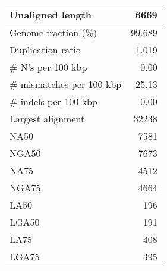 \documentclass[12pt,a4paper]{article}
\begin{document}
\begin{table}[ht]
\begin{center}
\begin{tabular}{|l*{1}{|r}|}
Unaligned length & 6669 \\ \hline
Genome fraction (\%) & 99.689 \\ \hline
Duplication ratio & 1.019 \\ \hline
\# N's per 100 kbp & 0.00 \\ \hline
\# mismatches per 100 kbp & 25.13 \\ \hline
\# indels per 100 kbp & 0.00 \\ \hline
Largest alignment & 32238 \\ \hline
NA50 & 7581 \\ \hline
NGA50 & 7673 \\ \hline
NA75 & 4512 \\ \hline
NGA75 & 4664 \\ \hline
LA50 & 196 \\ \hline
LGA50 & 191 \\ \hline
LA75 & 408 \\ \hline
LGA75 & 395 \\ \hline
\end{tabular}
\end{center}
\end{table}
\end{document}
